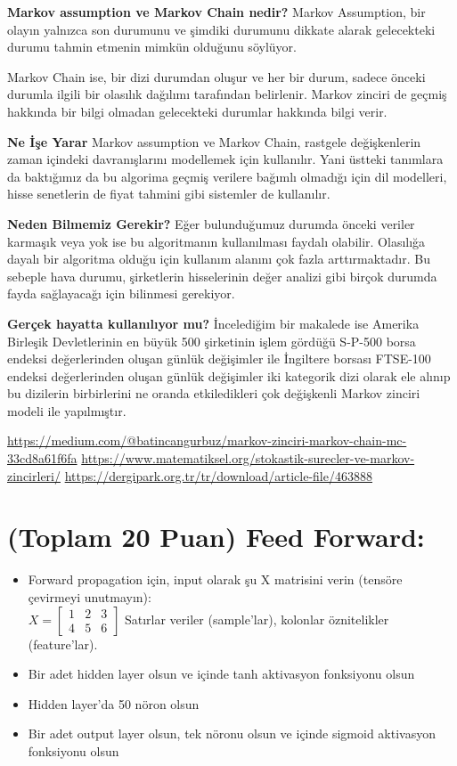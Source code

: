 \documentclass[11pt]{article}
\begin{document}
\textbf{Markov assumption ve Markov Chain nedir?}
Markov Assumption, bir olayın yalnızca son durumunu ve şimdiki durumunu dikkate alarak gelecekteki durumu tahmin etmenin mimkün olduğunu söylüyor.

Markov Chain ise, bir dizi durumdan oluşur ve her bir durum, sadece önceki durumla ilgili bir olasılık dağılımı tarafından belirlenir. Markov zinciri de geçmiş hakkında bir bilgi olmadan gelecekteki durumlar hakkında bilgi verir. 

\textbf{Ne İşe Yarar}
Markov assumption ve Markov Chain, rastgele değişkenlerin zaman içindeki davranışlarını modellemek için kullanılır. Yani üstteki tanımlara da baktığımız da bu algorima geçmiş verilere bağımlı olmadığı için dil modelleri, hisse senetlerin de fiyat tahmini gibi sistemler de kullanılır. 

\textbf{Neden Bilmemiz Gerekir?}
Eğer bulunduğumuz durumda önceki veriler karmaşık veya yok ise bu algoritmanın kullanılması faydalı olabilir. Olasılığa dayalı bir algoritma olduğu için kullanım alanını çok fazla arttırmaktadır. Bu sebeple hava durumu, şirketlerin hisselerinin değer analizi gibi birçok durumda fayda sağlayacağı için bilinmesi gerekiyor.

\textbf{Gerçek hayatta kullanılıyor mu?}
İncelediğim bir makalede ise Amerika Birleşik Devletlerinin en büyük 500 şirketinin işlem gördüğü S-P-500 borsa endeksi değerlerinden oluşan günlük değişimler ile İngiltere borsası FTSE-100 endeksi değerlerinden oluşan günlük değişimler iki kategorik dizi olarak ele alınıp bu dizilerin birbirlerini ne oranda etkiledikleri çok değişkenli Markov zinciri modeli ile yapılmıştır.

\url{https://medium.com/@batincangurbuz/markov-zinciri-markov-chain-mc-33cd8a61f6fa}
\url{https://www.matematiksel.org/stokastik-surecler-ve-markov-zincirleri/}
\url{https://dergipark.org.tr/tr/download/article-file/463888}

\section{(Toplam 20 Puan) Feed Forward:}
 
\begin{itemize}
    \item Forward propagation için, input olarak şu X matrisini verin (tensöre çevirmeyi unutmayın):\\
    $X = \begin{bmatrix}
        1 & 2 & 3\\
        4 & 5 & 6
        \end{bmatrix}$
    Satırlar veriler (sample'lar), kolonlar öznitelikler (feature'lar).
    \item Bir adet hidden layer olsun ve içinde tanh aktivasyon fonksiyonu olsun
    \item Hidden layer'da 50 nöron olsun
    \item Bir adet output layer olsun, tek nöronu olsun ve içinde sigmoid aktivasyon fonksiyonu olsun
\end{itemize}
\end{document}
